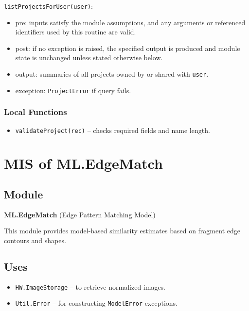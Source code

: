 \documentclass[12pt, titlepage]{article}
\begin{document}
\noindent \texttt{listProjectsForUser(user)}:
\begin{itemize}
    \item pre: inputs satisfy the module assumptions, and any arguments or referenced identifiers used by this routine are valid.
    \item post: if no exception is raised, the specified output is produced and module state is unchanged unless stated otherwise below.
    \item output: summaries of all projects owned by or shared with \texttt{user}.
    \item exception: \texttt{ProjectError} if query fails.
\end{itemize}

\subsubsection{Local Functions}
\begin{itemize}
    \item \texttt{validateProject(rec)} – checks required fields and name length.
\end{itemize}




\section{MIS of ML.EdgeMatch} \label{ML.EdgeMatch}

\subsection{Module}
\textbf{ML.EdgeMatch} \; (Edge Pattern Matching Model)

This module provides model-based similarity estimates based on fragment edge contours and shapes.

\subsection{Uses}
\begin{itemize}
    \item \texttt{HW.ImageStorage} – to retrieve normalized images.
    \item \texttt{Util.Error} – for constructing \texttt{ModelError} exceptions.
\end{itemize}
\end{document}
